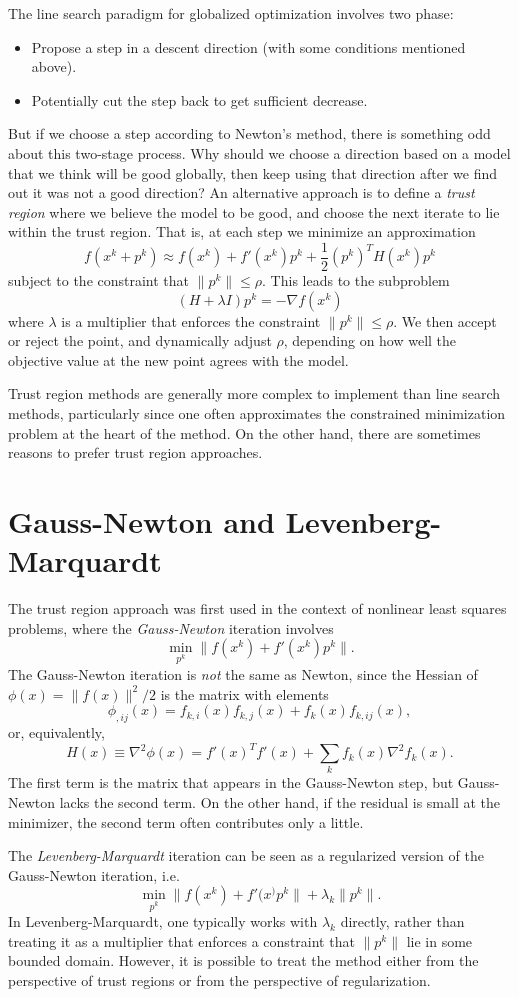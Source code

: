 \documentclass[12pt, leqno]{article} %
\begin{document}
The line search paradigm for globalized optimization involves
two phase:
\begin{itemize}
\item Propose a step in a descent direction (with some conditions
  mentioned above).
\item Potentially cut the step back to get sufficient decrease.
\end{itemize}
But if we choose a step according to Newton's method, there is
something odd about this two-stage process.  Why should we choose
a direction based on a model that we think will be good globally,
then keep using that direction after we find out it was not a
good direction?  An alternative approach is to define a
{\em trust region} where we believe the model to be good,
and choose the next iterate to lie within the trust region.
That is, at each step we minimize an approximation
\[
  f(x^k+p^k) \approx f(x^k) + f'(x^k) p^k + \frac{1}{2} (p^k)^T H(x^k) p^k
\]
subject to the constraint that $\|p^k\| \leq \rho$.  This leads to the
subproblem
\[
  (H+\lambda I) p^k = -\nabla f(x^k)
\]
where $\lambda$ is a multiplier that enforces the constraint $\|p^k\|
\leq \rho$.  We then accept or reject the point, and dynamically
adjust $\rho$, depending on how well the objective value at the new
point agrees with the model.

Trust region methods are generally more complex to implement than line
search methods, particularly since one often approximates the
constrained minimization problem at the heart of the method.  On the
other hand, there are sometimes reasons to prefer trust region
approaches.

\section*{Gauss-Newton and Levenberg-Marquardt}

The trust region approach was first used in the context of nonlinear
least squares problems, where the {\em Gauss-Newton} iteration
involves
\[
  \min_{p^k} \|f(x^k) + f'(x^k) p^k\|.
\]
The Gauss-Newton iteration is {\em not} the same as Newton,
since the Hessian of $\phi(x) = \|f(x)\|^2/2$ is the matrix
with elements
\[
  \phi_{,ij}(x) = f_{k,i}(x) f_{k,j}(x) + f_{k}(x) f_{k,ij}(x),
\]
or, equivalently,
\[
  H(x) \equiv \nabla^2 \phi(x) = f'(x)^T f'(x) + \sum_{k} f_k(x) \nabla^2 f_k(x).
\]
The first term is the matrix that appears in the Gauss-Newton step,
but Gauss-Newton lacks the second term.  On the other hand, if the
residual is small at the minimizer, the second term often contributes
only a little.

The {\em Levenberg-Marquardt} iteration can be seen as a regularized
version of the Gauss-Newton iteration, i.e.
\[
  \min_{p^k} \|f(x^k) + f'(x^) p^k\| + \lambda_k \|p^k\|.
\]
In Levenberg-Marquardt, one typically works with $\lambda_k$ directly,
rather than treating it as a multiplier that enforces a constraint
that $\|p^k\|$ lie in some bounded domain.  However, it is possible to
treat the method either from the perspective of trust regions or
from the perspective of regularization.
\end{document}
